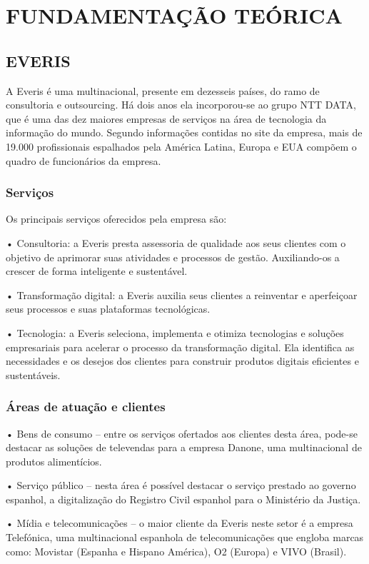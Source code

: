 \section{FUNDAMENTAÇÃO TEÓRICA}


\subsection{EVERIS}
A Everis é uma multinacional, presente em dezesseis países, do ramo de consultoria e outsourcing. Há dois anos ela incorporou-se ao grupo NTT DATA, que é uma das dez maiores empresas de serviços na área de tecnologia da informação do mundo. Segundo informações contidas no site da empresa, mais de 19.000 profissionais espalhados pela América Latina, Europa e EUA compõem o quadro de funcionários da empresa.

\subsubsection{Serviços}
Os principais serviços oferecidos pela empresa são:

•	Consultoria: a Everis presta assessoria de qualidade aos seus clientes com o objetivo de aprimorar suas atividades e processos de gestão. Auxiliando-os a crescer de forma inteligente e sustentável.

•	Transformação digital: a Everis auxilia seus clientes a reinventar e aperfeiçoar seus processos e suas plataformas tecnológicas.

•	Tecnologia: a Everis seleciona, implementa e otimiza tecnologias e soluções empresariais para acelerar o processo da transformação digital. Ela identifica as necessidades e os desejos dos clientes para construir produtos digitais eficientes e sustentáveis.

\subsubsection{Áreas de atuação e clientes}
•	Bens de consumo – entre os serviços ofertados aos clientes desta área, pode-se destacar as soluções de televendas para a empresa Danone, uma multinacional de produtos alimentícios.

•	Serviço público – nesta área é possível destacar o serviço prestado ao governo espanhol, a digitalização do Registro Civil espanhol para o Ministério da Justiça.

•	Mídia e telecomunicações –  o maior cliente da Everis neste setor é a empresa Telefónica, uma multinacional espanhola de telecomunicações que engloba marcas como: Movistar (Espanha e Hispano América), O2 (Europa) e VIVO (Brasil).

